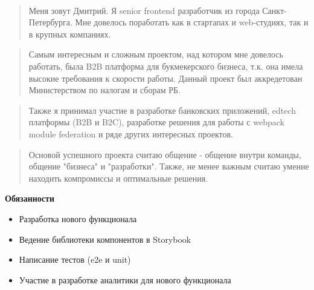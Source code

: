 \documentclass[10pt,a4paper,ragged2e,withhyper]{altacv}
\begin{document}
\begin{paracol}{2}
            \\
            \medskip



        \newpage
        \switchcolumn

            \begin{quote}
                Меня зовут Дмитрий. Я  senior frontend  разработчик из города Санкт-Петербурга.
                Мне довелось поработать как в стартапах и  web-студиях, так и в крупных компаниях.
            \end{quote}
            \begin{quote}
                Самым интересным и сложным проектом, над котором мне довелось работать, была B2B  платформа для букмекерского бизнеса, т.к. она имела высокие требования к скорости работы.
                Данный проект был аккредетован Министерством по налогам и сборам РБ.
            \end{quote}
            \begin{quote}
                Также я принимал участие в разработке банковских приложений, edtech  платформы (B2B  и B2C), разработке решения для работы с webpack module federation и ряде других интересных проектов.
            \end{quote}
            \begin{quote}
                Основой успешного проекта считаю общение - общение внутри команды, общение "бизнеса"{ }и  "разработки". Также, не менее важным считаю умение находить компромиссы и оптимальные решения.
            \end{quote}
            \textbf{Обязанности}
            \begin{itemize}
                \item Разработка нового функционала
                \item Ведение библиотеки компонентов в Storybook
                \item Написание тестов (e2e и unit)
                \item Участие в разработке аналитики для нового функционала

\end{itemize}
\end{paracol}
\end{document}
